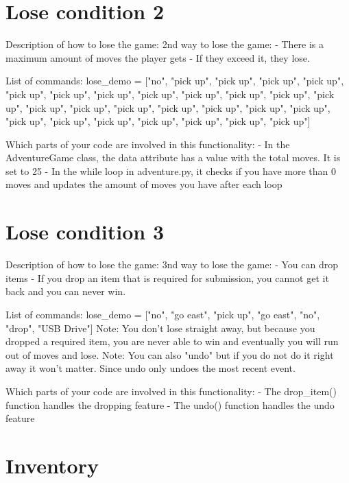 \documentclass[11pt]{article}
\begin{document}
\section*{Lose condition 2}
Description of how to lose the game:
2nd way to lose the game:
    - There is a maximum amount of moves the player gets
    - If they exceed it, they lose.

List of commands: lose_demo = ["no", "pick up", "pick up", "pick up", "pick up", "pick up", "pick up",
                               "pick up", "pick up", "pick up", "pick up", "pick up", "pick up", "pick up",
                               "pick up", "pick up", "pick up", "pick up", "pick up", "pick up", "pick up",
                               "pick up", "pick up", "pick up", "pick up", "pick up", "pick up"]

Which parts of your code are involved in this functionality:
    - In the AdventureGame class, the data attribute has a value with the total moves. It is set to 25
    - In the while loop in adventure.py, it checks if you have more than 0 moves and updates the amount of moves you have after each loop

\section*{Lose condition 3}
Description of how to lose the game:
3nd way to lose the game:
    - You can drop items
    - If you drop an item that is required for submission, you cannot get it back and you can never win.

List of commands: lose_demo = ["no", "go east", "pick up", "go east", "no", "drop", "USB Drive"]
Note: You don't lose straight away, but because you dropped a required item, you are never able to win and eventually you will run out of moves and lose.
Note: You can also "undo" but if you do not do it right away it won't matter. Since undo only undoes the most recent event.

Which parts of your code are involved in this functionality:
    - The drop_item() function handles the dropping feature
    - The undo() function handles the undo feature

\section*{Inventory}
\end{document}
